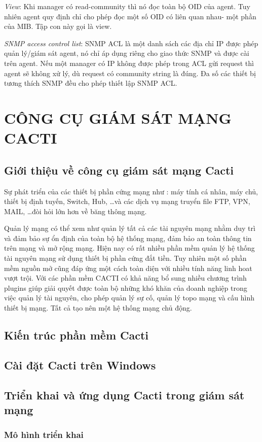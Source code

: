 \documentclass[12pt,oneside,a4paper,reqno]{report}
\begin{document}
\begin{large}
{\it View}: Khi manager có read-community thì nó đọc toàn bộ OID của agent. Tuy nhiên agent quy định chỉ cho phép đọc một số OID có liên quan nhau- một phần của MIB. Tập con này gọi là view.

{\it SNMP access control list}: SNMP ACL là một danh sách các địa chỉ IP được phép quản lý/giám sát agent, nó chỉ áp dụng riêng cho giao thức SNMP và được cài trên agent. Nếu một manager có IP không được phép trong ACL gửi request thì agent sẽ không xử lý, dù request có community string là đúng. Đa số các thiết bị tương thích SNMP đều cho phép thiết lập SNMP ACL.
\chapter{CÔNG CỤ GIÁM SÁT MẠNG CACTI}
\section{Giới thiệu về công cụ giám sát mạng Cacti}
Sự phát triển của các thiết bị phần cứng mạng như : máy tính cá nhân, máy chủ, thiết bị định tuyến, Switch, Hub, \ldots và các dịch vụ mạng truyển file FTP, VPN, MAIL, \ldots đòi hỏi lớn hơn về băng thông mạng.

Quản lý mạng có thể xem như quản lý tất cả các tài nguyên mạng nhằm duy trì và đảm bảo sự ổn định của toàn bộ hệ thống mạng, đảm bảo an toàn thông tin trên mạng và mở rộng mạng. Hiện nay có rất nhiều phần mềm quản lý hệ thống tài nguyên mạng sử dụng thiết bị phần cứng đắt tiền. Tuy nhiên một số phần mềm nguồn mở cũng đáp ứng một cách toàn diện với nhiều tính năng linh hoat vượt trội. Với các phần mềm CACTI có khả năng bổ sung nhiều chương trình plugins giúp giải quyết được toàn bộ những khó khăn của doanh nghiệp trong việc quản lý tài nguyên, cho phép quản lý sự cố, quản lý topo mạng và cấu hình thiết bị mạng. Tất cả tạo nên một hệ thống mạng chủ động. 
\section{Kiến trúc phần mềm Cacti}
\section{Cài đặt Cacti trên Windows}
\section{Triển khai và ứng dụng Cacti trong giám sát mạng}
\subsection{Mô hình triển khai}

\end{large}
\end{document}
